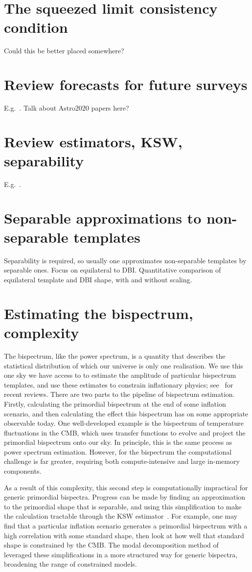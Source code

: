     \newpage
    \section{The squeezed limit consistency condition}
    Could this be better placed somewhere?
\newpage
    \section{Review forecasts for future surveys}
    E.g.~\cite{Sohn_2019}. Talk about Astro2020 papers here?~\cite{astro2020_png, astro2020_features}
    \newpage
    \section{Review estimators, KSW, separability}
    E.g.~\cite{Smith_2011, Komatsu_2005}.
\newpage
    \section{Separable approximations to non-separable templates}
    Separability is required, so usually one approximates non-separable templates
    by separable ones.
\newpage
    Focus on equilateral to DBI.
    Quantitative comparison of equilateral template and DBI shape,
    with and without scaling.
\newpage
    \section{Estimating the bispectrum, complexity}
    The bispectrum, like the power spectrum, is a quantity that describes
the statistical distribution of which our universe is only one realisation.
We use this one sky we have access to to estimate the amplitude of
particular bispectrum templates,
and use these estimates to constrain inflationary physics; 
see~\cite{astro2020_features,astro2020_png} for recent reviews.
There are two parts to the pipeline of bispectrum estimation.
Firstly, calculating the primordial bispectrum at the end of some inflation scenario,
and then calculating the effect this bispectrum
has on some appropriate observable today.
One well-developed example is
the bispectrum of temperature fluctuations in the CMB, which uses transfer functions
to evolve and project the primordial bispectrum onto our sky.
In principle, this is the same process as power spectrum estimation.
However, for the bispectrum the computational challenge is far greater,
requiring both compute-intensive and large in-memory components.


As a result of this complexity, this second step is computationally impractical for generic primordial bispectra.
Progress can be made by finding an approximation to the primordial shape
that is separable, and using this simplification
to make the calculation tractable
through the KSW estimator~\cite{Komatsu_2005, Munchmeyer_2014}.
For example, one may find that a particular inflation scenario generates
a primordial bispectrum with a high correlation with some standard shape,
then look at how well that standard shape is constrained by the CMB.
The modal decomposition method of~\cite{FergShell_1,FergShell_2,FergShell_3}
leveraged these simplifications in a more structured way
for generic bispectra, broadening the range of constrained models.


